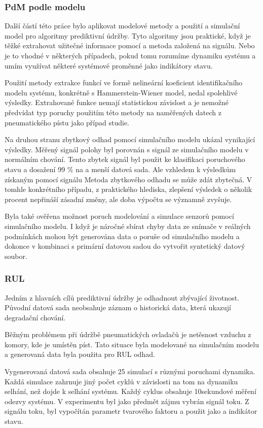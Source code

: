 \subsubsection*{PdM podle modelu}

Další částí této práce bylo aplikovat modelové metody a použití a
simulační model pro algoritmy prediktivní údržby. Tyto algoritmy
jsou praktické, když je těžké extrahovat užitečné informace pomocí a
metoda založená na signálu. Nebo je to vhodné v některých případech, pokud tomu rozumíme
dynamiku systému a umím využívat některé systémové proměnné jako
indikátory stavu.

Použití metody extrakce funkcí ve formě nelineární
koeficient identifikačního modelu systému, konkrétně s
Hammerstein-Wiener model, nedal spolehlivé výsledky. Extrahované funkce
nemají statistickou závislost a je nemožné předvídat typ poruchy
použitím této metody na naměřených datech z pneumatického pístu jako případ
studie.

Na druhou stranu zbytkový odhad pomocí simulačního modelu
ukázal vynikající výsledky. Měřený signál polohy byl porovnán s
signál ze simulačního modelu v normálním chování. Tento zbytek
signál byl použit ke klasifikaci poruchového stavu a dosažení 99 \% na a
menší datová sada. Ale vzhledem k výsledkům získaným pomocí signálu
Metoda zbytkového odhadu se může zdát zbytečná. V tomhle
konkrétního případu, z praktického hlediska, zlepšení
výsledek o několik procent nepřináší zásadní změny, ale
doba výpočtu se významně zvyšuje.

Byla také ověřena možnost poruch modelování a simulace senzorů
pomocí simulačního modelu. I když je náročné sbírat chyby
data ze snímače v reálných podmínkách mohou být generována data o poruše
od simulačního modelu a dokonce v kombinaci s primární datovou sadou do
vytvořit syntetický datový soubor.

\subsubsection*{RUL}

Jedním z hlavních cílů prediktivní údržby je odhadnout
zbývající životnost. Původní datová sada neobsahuje záznam o
historická data, která ukazují degradační chování.

Běžným problémem při údržbě pneumatických ovladačů je netěsnost
vzduchu z komory, kde je umístěn píst. Tato situace byla
modelované na simulačním modelu a generovaná data byla použita pro RUL
odhad.

Vygenerovaná datová sada obsahuje 25 simulací s různými poruchami
dynamika. Každá simulace zahrnuje jiný počet cyklů v závislosti na tom
na dynamiku selhání, než dojde k selhání systému. Každý cyklus
obsahuje 10sekundové měření odezvy systému. V
experimentu byl jako předmět zájmu vybrán signál toku. Z
signálu toku, byl vypočítán parametr tvarového faktoru a použit jako a
indikátor stavu.

